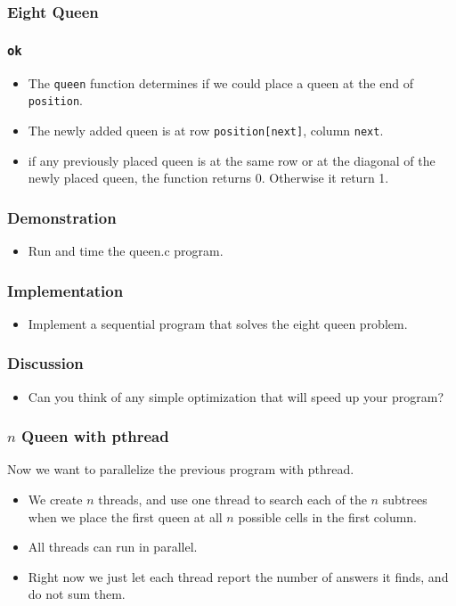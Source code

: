 \documentclass{beamer}
\begin{document}
\begin{frame}
\frametitle{Eight Queen}
\end{frame}

\begin{frame}
\frametitle{\tt ok}
\begin{itemize}
\item The {\tt queen} function determines if we could place a queen
 at the end of {\tt position}.
\item The newly added queen is at row {\tt position[next]}, column
  {\tt next}.
\item if any previously placed queen is at the same row or at the
  diagonal of the newly placed queen, the function returns 0.
  Otherwise it return 1.
\end{itemize}
\end{frame}

\begin{frame}
\frametitle{Demonstration}
\begin{itemize}
\item Run and time the queen.c program.
\end{itemize}
\end{frame}

\begin{frame}
\frametitle{Implementation}
\begin{itemize}
\item Implement a sequential program that solves the eight queen
  problem.
\end{itemize}
\end{frame}

\begin{frame}
\frametitle{Discussion}
\begin{itemize}
\item Can you think of any simple optimization that will speed up your
  program?
\end{itemize}
\end{frame}

\begin{frame}
\frametitle{$n$ Queen with pthread} Now we want to parallelize the
previous program with pthread.
\begin{itemize}
\item We create $n$ threads, and use one thread to search each of the
  $n$ subtrees when we place the first queen at all $n$ possible cells
  in the first column.
\item All threads can run in parallel.  
\item Right now we just let each thread report the number of answers
  it finds, and do not sum them.
\end{itemize}
\end{frame}
\end{document}
